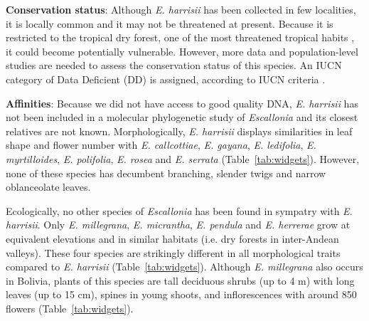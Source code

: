 \documentclass[fleqn,10pt,lineno]{wlpeerj} %
\begin{document}
\textbf{Conservation status}: Although \emph{E. harrisii} has been collected in few localities, it is locally common and it may not be threatened at present. Because it is restricted to the tropical dry forest, one of the most threatened tropical habits \citep{DRYFLOR:2016gr}, it could become potentially vulnerable. However, more data and population-level studies are needed to assess the conservation status of this species. An IUCN category of Data Deficient (DD) is assigned, according to IUCN criteria \citep{IUCN:2012aa}.

\textbf{Affinities}: Because we did not have access to good quality DNA, \emph{E. harrisii} has not been included in a molecular phylogenetic study of \emph{Escallonia} and its closest relatives are not known.  Morphologically, \emph{E. harrisii} displays similarities in leaf shape and flower number with \emph{E. callcottiae}, \emph{E. gayana}, \emph{E. ledifolia}, \emph{E. myrtilloides}, \emph{E. polifolia}, \emph{E. rosea} and \emph{E. serrata} (Table~\ref{tab:widgets}). However, none of these species has decumbent branching, slender twigs and narrow oblanceolate leaves.

Ecologically, no other species of \emph{Escallonia} has been found in sympatry with \emph{E. harrisii}. Only \emph{E. millegrana}, \emph{E. micrantha}, \emph{E. pendula} and \emph{E. herrerae} grow at equivalent elevations and in similar habitats (i.e. dry forests in inter-Andean valleys). These four species are strikingly different in all morphological traits compared to \emph{E. harrisii} (Table~\ref{tab:widgets}). Although \emph{E. millegrana} also occurs in Bolivia, plants of this species are tall deciduous shrubs (up to 4 m) with long leaves (up to 15 cm), spines in young shoots, and inflorescences with around 850 flowers (Table~\ref{tab:widgets}).
\end{document}
